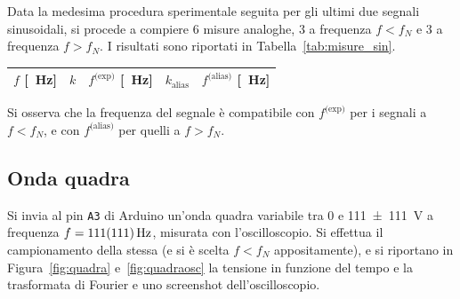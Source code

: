 \documentclass[10pt,oneside,a4paper]{article}
\newenvironment{Figure}
  {\par\medskip\noindent\minipage{\linewidth}}
  {\endminipage\par\medskip}
\begin{document}
\begin{multicols}{2}
%

Data la medesima procedura sperimentale seguita per gli ultimi due segnali sinusoidali, si procede a compiere $6$ misure analoghe, $3$ a frequenza $f<f_N$ e $3$ a frequenza $f>f_N$. I risultati sono riportati in Tabella~\ref{tab:misure_sin}.

\begin{center}
\label{tab:misure_sin}
\begin{tabular}{c|c|c|c|c}
$f$ [\SI{}{Hz}] & $k$ & $f^\text{(exp)}$ [\SI{}{Hz}] & $k_\text{alias}$ & $f^\text{(alias)}$ [\SI{}{Hz}] \\
\hline
\hline
\end{tabular}
\end{center}

Si osserva che la frequenza del segnale è compatibile con $f^\text{(exp)}$ per i segnali a $f<f_N$, e con $f^\text{(alias)}$ per quelli a $f>f_N$.


\subsection{Onda quadra}
Si invia al pin \texttt{A3} di Arduino un'onda quadra variabile tra $0$ e \SI{111 \pm 111}{V} a frequenza $f = \SI{111 \pm 111}{\Hz}$, misurata con l'oscilloscopio. Si effettua il campionamento della stessa (e si è scelta $f<f_N$ appositamente), e si riportano in Figura~\ref{fig:quadra} e~\ref{fig:quadraosc} la tensione in funzione del tempo e la trasformata di Fourier e uno screenshot dell'oscilloscopio. 

%


\end{multicols}
\end{document}
